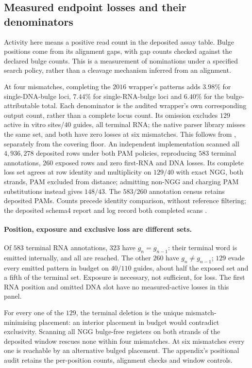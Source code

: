 \subsection{Measured endpoint losses and their denominators}
\label{ssec:measured-losses}
Activity here means a positive read count in the deposited assay table. Bulge
positions come from its alignment gaps, with gap counts checked against the
declared bulge counts. This is a measurement of nominations under a specified
search policy, rather than a cleavage mechanism inferred from an alignment.

At four mismatches, completing the $2016$ wrapper's patterns adds $3.98\%$
for single-DNA-bulge loci, $7.44\%$ for single-RNA-bulge loci and $6.40\%$ for
the bulge-attributable total. Each denominator is the audited wrapper's own
corresponding output count, rather than a complete locus count. Its omission excludes $129$ active in vitro sites/$40$
guides, all terminal RNA; the native parser library misses the same set, and both
have zero losses at six mismatches. This follows from ,
separately from the covering floor.
An independent implementation scanned all $4{,}936{,}278$ deposited rows under both
PAM policies, reproducing $583$ terminal annotations, $260$ exposed rows and zero
first-RNA and DNA losses. Its complete loss set agrees at row identity and multiplicity
on $129/40$ with exact NGG, both strands, PAM excluded from distance; admitting
non-NGG and charging PAM substitutions instead gives $148/43$. The $583/260$
annotation census retains deposited PAMs. Counts precede identity comparison,
without reference filtering; the deposited schema4 report and log record both
completed scans \citep{zw4_reconciliation_2026}.

\paragraph{Position, exposure and exclusive loss are different sets.}
Of $583$ terminal RNA annotations, $323$ have $g_n=g_{n-1}$: their terminal
word is emitted internally, and all are reached. The other $260$ have
$g_n\ne g_{n-1}$; $129$ evade every emitted pattern in budget on $40/110$ guides,
about half the exposed set and a fifth of the terminal set. Exposure is necessary,
not sufficient, for loss. The first RNA position and omitted DNA slot have no
measured-active losses in this panel.

For every one of the $129$, the terminal deletion is the unique
mismatch-minimising placement: an interior placement in budget would contradict
exclusivity. Scanning all NGG bulge-free registers on both strands of the deposited
window rescues none within four mismatches. At six mismatches every one is
reachable by an alternative bulged placement. The appendix's positional audit
retains the per-position counts, alignment checks and window controls.


